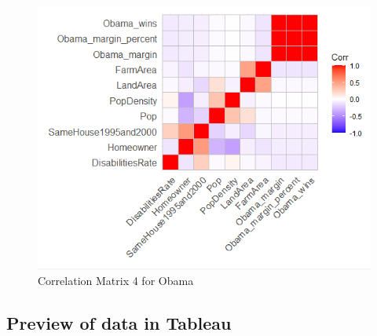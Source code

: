 \documentclass[11pt]{article}
\begin{document}
\begin{figure}[H]
    \centering
    \includegraphics[width=0.90\columnwidth]{assets/oc4.PNG}
    \caption{Correlation Matrix 4 for Obama}
    \label{lr}
\end{figure}




\subsection{Preview of data in Tableau}
\end{document}
